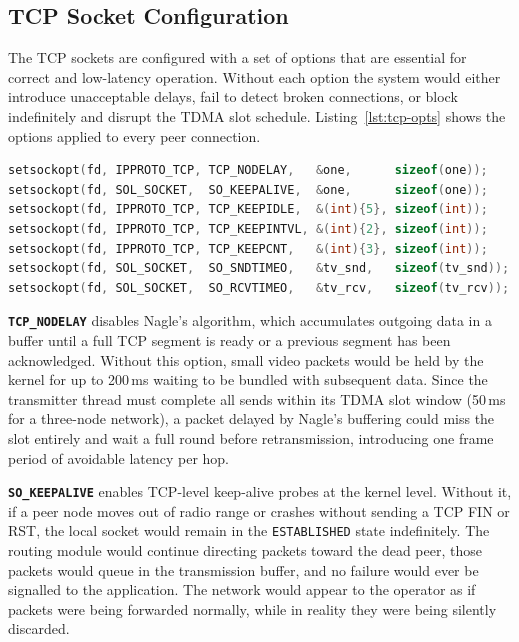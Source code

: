 \subsection{TCP Socket Configuration}

The TCP sockets are configured with a set of options that are essential for correct and
low-latency operation. Without each option the system would either introduce unacceptable
delays, fail to detect broken connections, or block indefinitely and disrupt the TDMA slot
schedule. Listing~\ref{lst:tcp-opts} shows the options applied to every peer connection.

\begin{lstlisting}[language=C,
    caption={TCP socket options applied to each peer connection},
    label={lst:tcp-opts}]
setsockopt(fd, IPPROTO_TCP, TCP_NODELAY,   &one,      sizeof(one));
setsockopt(fd, SOL_SOCKET,  SO_KEEPALIVE,  &one,      sizeof(one));
setsockopt(fd, IPPROTO_TCP, TCP_KEEPIDLE,  &(int){5}, sizeof(int));
setsockopt(fd, IPPROTO_TCP, TCP_KEEPINTVL, &(int){2}, sizeof(int));
setsockopt(fd, IPPROTO_TCP, TCP_KEEPCNT,   &(int){3}, sizeof(int));
setsockopt(fd, SOL_SOCKET,  SO_SNDTIMEO,   &tv_snd,   sizeof(tv_snd));
setsockopt(fd, SOL_SOCKET,  SO_RCVTIMEO,   &tv_rcv,   sizeof(tv_rcv));
\end{lstlisting}

\textbf{\texttt{TCP\_NODELAY}} disables Nagle's algorithm, which accumulates outgoing data
in a buffer until a full TCP segment is ready or a previous segment has been acknowledged.
Without this option, small video packets would be held by the kernel for up to 200\,ms
waiting to be bundled with subsequent data. Since the transmitter thread must complete all
sends within its TDMA slot window (50\,ms for a three-node network), a packet delayed by
Nagle's buffering could miss the slot entirely and wait a full round before retransmission,
introducing one frame period of avoidable latency per hop.

\textbf{\texttt{SO\_KEEPALIVE}} enables TCP-level keep-alive probes at the kernel level.
Without it, if a peer node moves out of radio range or crashes without sending a TCP FIN or
RST, the local socket would remain in the \texttt{ESTABLISHED} state indefinitely. The routing
module would continue directing packets toward the dead peer, those packets would queue in
the transmission buffer, and no failure would ever be signalled to the application. The network
would appear to the operator as if packets were being forwarded normally, while in reality they
were being silently discarded.

